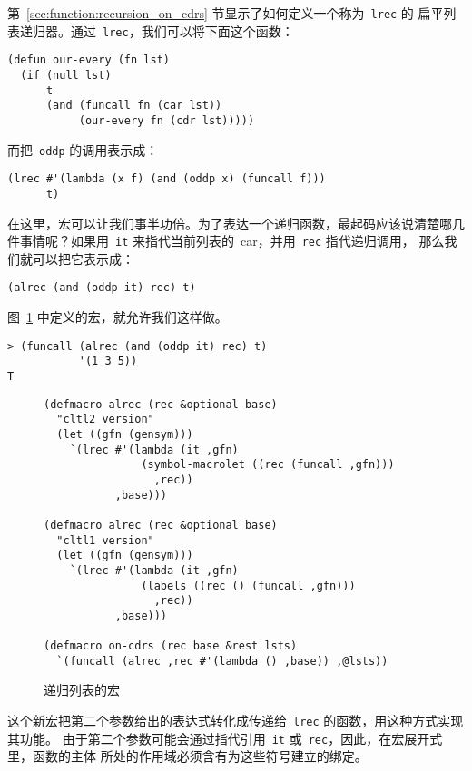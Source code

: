 第~\ref{sec:function:recursion_on_cdrs} 节显示了如何定义一个称为~\texttt{lrec} 的
扁平列表递归器。通过~\texttt{lrec}，我们可以将下面这个函数：
\begin{lstlisting}
(defun our-every (fn lst)
  (if (null lst)
      t
      (and (funcall fn (car lst))
           (our-every fn (cdr lst)))))
\end{lstlisting}
而把~\texttt{oddp} 的调用表示成：
\begin{lstlisting}
(lrec #'(lambda (x f) (and (oddp x) (funcall f)))
      t)
\end{lstlisting}

在这里，宏可以让我们事半功倍。为了表达一个递归函数，最起码应该说清楚哪几件事情呢？如果用~\verb|it| 来指代当前列表的~car，并用~\verb|rec| 指代递归调用，
那么我们就可以把它表示成：
\begin{lstlisting}
(alrec (and (oddp it) rec) t)
\end{lstlisting}
图~\ref{fig:macros_for_list_recursion} 中定义的宏，就允许我们这样做。
\begin{lstlisting}
> (funcall (alrec (and (oddp it) rec) t)
           '(1 3 5))
T
\end{lstlisting}

\begin{figure}
\begin{lstlisting}
(defmacro alrec (rec &optional base)
  "cltl2 version"
  (let ((gfn (gensym)))
    `(lrec #'(lambda (it ,gfn)
               (symbol-macrolet ((rec (funcall ,gfn)))
                 ,rec))
           ,base)))

(defmacro alrec (rec &optional base)
  "cltl1 version"
  (let ((gfn (gensym)))
    `(lrec #'(lambda (it ,gfn)
               (labels ((rec () (funcall ,gfn)))
                 ,rec))
           ,base)))

(defmacro on-cdrs (rec base &rest lsts)
  `(funcall (alrec ,rec #'(lambda () ,base)) ,@lsts))
\end{lstlisting}
  \caption{递归列表的宏}
  \label{fig:macros_for_list_recursion}
\end{figure}

这个新宏把第二个参数给出的表达式转化成传递给~\texttt{lrec} 的函数，用这种方式实现其功能。
由于第二个参数可能会通过指代引用~\texttt{it} 或~\texttt{rec}，因此，在宏展开式里，函数的主体
所处的作用域必须含有为这些符号建立的绑定。

